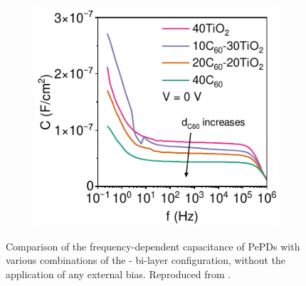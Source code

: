 \begin{figure}[ht!]
    \centering
    
    \begin{subfigure}[t]{0.45\textwidth}
        \centering
        \includegraphics[width=\textwidth]{chapters/transport_layers/images/Cf_comparison.pdf} %
        
    \end{subfigure}
    \caption[Comparison of the frequency-dependent capacitance of PePDs with various combinations of the - bi-layer configuration.]{Comparison of the frequency-dependent capacitance of PePDs with various combinations of the - bi-layer configuration, without the application of any external bias. Reproduced from \cite{Papadopoulou2025ElectronSpeed}.}
    \label{fig:etl_opt:capacitance}
\end{figure}


